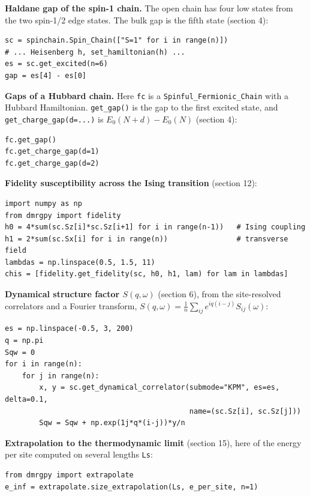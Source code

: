 \documentclass[11pt]{article}
\begin{document}
\textbf{Haldane gap of the spin-1 chain.} The open chain has four low states
from the two spin-1/2 edge states. The bulk gap is the fifth state
(section 4):

\begin{lstlisting}
sc = spinchain.Spin_Chain(["S=1" for i in range(n)])
# ... Heisenberg h, set_hamiltonian(h) ...
es = sc.get_excited(n=6)
gap = es[4] - es[0]
\end{lstlisting}

\textbf{Gaps of a Hubbard chain.} Here \texttt{fc} is a \texttt{Spinful\_\allowbreak{}Fermionic\_\allowbreak{}Chain}
with a Hubbard Hamiltonian. \texttt{get\_\allowbreak{}gap()} is the gap to the first excited
state, and \texttt{get\_\allowbreak{}charge\_\allowbreak{}gap(d=.\allowbreak{}.\allowbreak{}.\allowbreak{})} is \(E_0(N+d)-E_0(N)\) (section 4):

\begin{lstlisting}
fc.get_gap()
fc.get_charge_gap(d=1)
fc.get_charge_gap(d=2)
\end{lstlisting}

\textbf{Fidelity susceptibility across the Ising transition} (section 12):

\begin{lstlisting}
import numpy as np
from dmrgpy import fidelity
h0 = 4*sum(sc.Sz[i]*sc.Sz[i+1] for i in range(n-1))   # Ising coupling
h1 = 2*sum(sc.Sx[i] for i in range(n))                # transverse field
lambdas = np.linspace(0.5, 1.5, 11)
chis = [fidelity.get_fidelity(sc, h0, h1, lam) for lam in lambdas]
\end{lstlisting}

\textbf{Dynamical structure factor \(S(q,\omega)\)} (section 6), from the
site-resolved correlators and a Fourier transform,
\(S(q,\omega)=\frac1n\sum_{ij}e^{iq(i-j)}S_{ij}(\omega)\):

\begin{lstlisting}
es = np.linspace(-0.5, 3, 200)
q = np.pi
Sqw = 0
for i in range(n):
    for j in range(n):
        x, y = sc.get_dynamical_correlator(submode="KPM", es=es, delta=0.1,
                                           name=(sc.Sz[i], sc.Sz[j]))
        Sqw = Sqw + np.exp(1j*q*(i-j))*y/n
\end{lstlisting}

\textbf{Extrapolation to the thermodynamic limit} (section 15), here of the
energy per site computed on several lengths \texttt{Ls}:

\begin{lstlisting}
from dmrgpy import extrapolate
e_inf = extrapolate.size_extrapolation(Ls, e_per_site, n=1)
\end{lstlisting}
\end{document}
